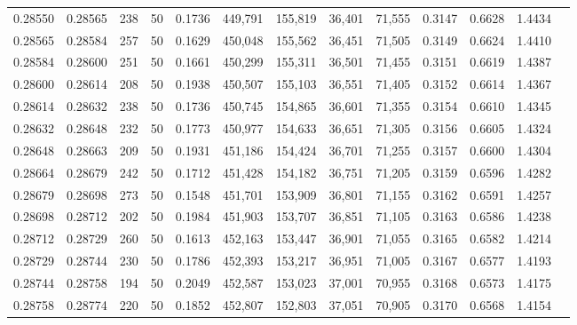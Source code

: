 \begin{tabular}{rrrrrrrrrrrrr}
0.28550 & 0.28565 &   238 &  50 &                                     0.1736 & 449,791 & 155,819 &  36,401 &  71,555 & 0.3147 & 0.6628 & 1.4434 \\
0.28565 & 0.28584 &   257 &  50 &                                     0.1629 & 450,048 & 155,562 &  36,451 &  71,505 & 0.3149 & 0.6624 & 1.4410 \\
0.28584 & 0.28600 &   251 &  50 &                                     0.1661 & 450,299 & 155,311 &  36,501 &  71,455 & 0.3151 & 0.6619 & 1.4387 \\
0.28600 & 0.28614 &   208 &  50 &                                     0.1938 & 450,507 & 155,103 &  36,551 &  71,405 & 0.3152 & 0.6614 & 1.4367 \\
0.28614 & 0.28632 &   238 &  50 &                                     0.1736 & 450,745 & 154,865 &  36,601 &  71,355 & 0.3154 & 0.6610 & 1.4345 \\
0.28632 & 0.28648 &   232 &  50 &                                     0.1773 & 450,977 & 154,633 &  36,651 &  71,305 & 0.3156 & 0.6605 & 1.4324 \\
0.28648 & 0.28663 &   209 &  50 &                                     0.1931 & 451,186 & 154,424 &  36,701 &  71,255 & 0.3157 & 0.6600 & 1.4304 \\
0.28664 & 0.28679 &   242 &  50 &                                     0.1712 & 451,428 & 154,182 &  36,751 &  71,205 & 0.3159 & 0.6596 & 1.4282 \\
0.28679 & 0.28698 &   273 &  50 &                                     0.1548 & 451,701 & 153,909 &  36,801 &  71,155 & 0.3162 & 0.6591 & 1.4257 \\
0.28698 & 0.28712 &   202 &  50 &                                     0.1984 & 451,903 & 153,707 &  36,851 &  71,105 & 0.3163 & 0.6586 & 1.4238 \\
0.28712 & 0.28729 &   260 &  50 &                                     0.1613 & 452,163 & 153,447 &  36,901 &  71,055 & 0.3165 & 0.6582 & 1.4214 \\
0.28729 & 0.28744 &   230 &  50 &                                     0.1786 & 452,393 & 153,217 &  36,951 &  71,005 & 0.3167 & 0.6577 & 1.4193 \\
0.28744 & 0.28758 &   194 &  50 &                                     0.2049 & 452,587 & 153,023 &  37,001 &  70,955 & 0.3168 & 0.6573 & 1.4175 \\
0.28758 & 0.28774 &   220 &  50 &                                     0.1852 & 452,807 & 152,803 &  37,051 &  70,905 & 0.3170 & 0.6568 & 1.4154 \\

\end{tabular}
